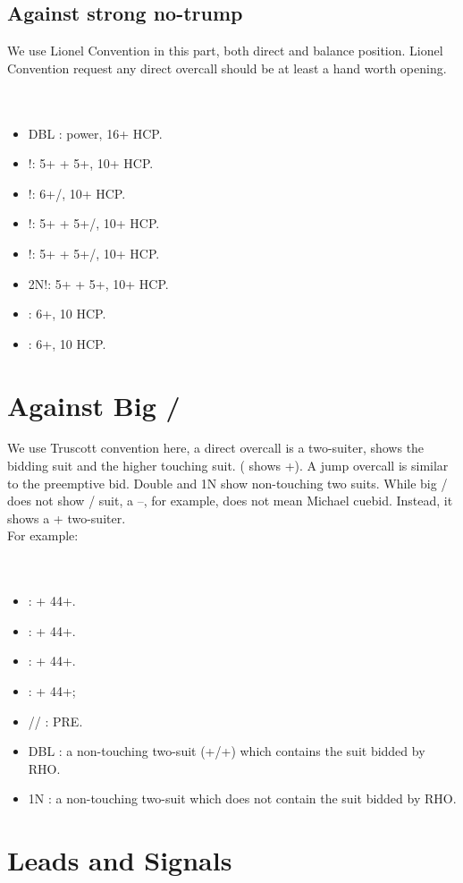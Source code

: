 \documentclass[12pt,twoside,a5paper]{report}%
\begin{document}
	\section*{Against strong no-trump}
		We use Lionel Convention in this part, both direct and balance position. Lionel Convention request any direct overcall should be at least a hand worth opening.\\
		\\
		\\
		\begin{itemize}
		\renewcommand{\labelitemi}{--}
			\item DBL : power, 16+ HCP.
			\item {}!: 5+\sp{} + 5+\he{}, 10+ HCP.
			\item {}!: 6+\sp{}/\he{}, 10+ HCP.
			\item {}!: 5+\he{} + 5+\cl{}/\di{}, 10+ HCP.
			\item {}!: 5+\sp{} + 5+\cl{}/\di{}, 10+ HCP.
			\item 2N!: 5+\cl{} + 5+\di{}, 10+ HCP.
			\item {} : 6+\cl{}, 10 HCP.
			\item {} : 6+\di{}, 10 HCP.
		\end{itemize}
\chapter*{Against Big \cl{}/\di{}}
	We use Truscott convention here, a direct overcall is a two-suiter, shows the bidding suit and the higher touching suit. ( shows \sp{}+\cl{}). A jump overcall is similar to the preemptive bid. Double and 1N show non-touching two suits. While big \cl{}/\di{} does not show \cl{}/\di{} suit, a --, for example, does not mean Michael cuebid. Instead, it shows a \cl{}+\di{} two-suiter.\\
	For example:\\
	\\
	\\
	\begin{itemize}
	\renewcommand{\labelitemi}{--}
		\item {} : \di{}+\he{} 44+.
		\item {} : \he{}+\sp{} 44+.
		\item {} : \sp{}+\cl{} 44+.
		\item {} : \cl{}+\di{} 44+;
		\item {}/\he{}/\sp{} : PRE.
		\item DBL : a non-touching two-suit (\he{}+\cl{}/\sp{}+\di{}) which contains the suit bidded by RHO.
		\item 1N : a non-touching two-suit which does not contain the suit bidded by RHO.
	\end{itemize}
\chapter*{Leads and Signals}
\end{document}
